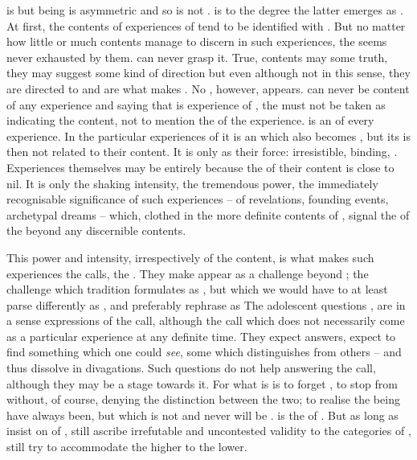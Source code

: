 \pa {} is  but being is asymmetric and so  is not
.  is  to the degree the latter emerges as
.  At first, the contents of experiences of  tend to be
identified with . But no matter how little or much contents 
manage to discern in such experiences, the  seems never exhausted by
them.  can never grasp it.  True, contents may  some truth,
they may suggest some kind of direction but even although not  in this
sense, they are directed to  and are what makes  .
No , however, appears.   can never be content of any
experience and saying that  is  experience of , the
 must not be taken as indicating the content, not to mention the
 of the experience.   is an  of every
experience.  In the particular experiences of
 it is an  which also becomes , but its
 is then not related to their content. It is  only
as their force: irresistible, binding, . Experiences themselves may
be entirely  because the  of their content is close to
nil.  It is only the shaking intensity, the tremendous power, the immediately
recognisable significance of such experiences -- of revelations, founding
events, {archetypal dreams} -- which, clothed in the more definite contents of
, signal the  of the  beyond any
discernible contents.

This power and intensity, irrespectively of the content, is what makes such
experiences the {calls}, the .  They make  appear as a
challenge beyond ; the challenge which tradition formulates as
, but which we would have to at least parse differently as
, and preferably rephrase as   The
adolescent questions ,  are in
a sense {expressions} of the call, although the call which does not necessarily
come as a particular experience at any definite time. They expect answers,
expect to find something which one could {\em see}, some  
which distinguishes  from others -- and thus dissolve in 
divagations. Such questions do not help answering the call, although they may be
a stage towards it. For what is  is to forget , to stop
  from  without, of course, denying the
distinction between the two; to realise the being  have always been, but
which is not and never will be .   is the  of
. But as long as  insist on  of , 
still ascribe irrefutable and uncontested validity to the categories of
,  still try to accommodate the higher to the lower.



